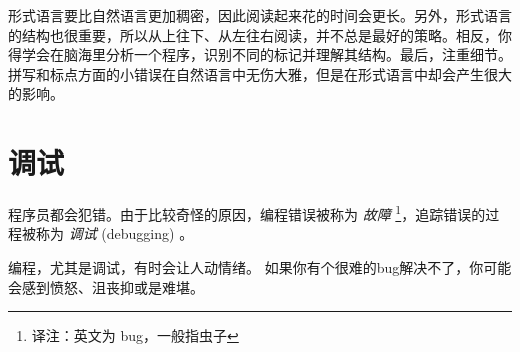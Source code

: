 
形式语言要比自然语言更加稠密，因此阅读起来花的时间会更长。另外，形式语言的结构也很重要，所以从上往下、从左往右阅读，并不总是最好的策略。相反，你得学会在脑海里分析一个程序，识别不同的标记并理解其结构。最后，注重细节。拼写和标点方面的小错误在自然语言中无伤大雅，但是在形式语言中却会产生很大的影响。

\section{调试}
  


程序员都会犯错。由于比较奇怪的原因，编程错误被称为 {\em 故障} \footnote{译注：英文为 bug，一般指虫子}，追踪错误的过程被称为 {\em 调试} (debugging) 。
  
  


编程，尤其是调试，有时会让人动情绪。 如果你有个很难的bug解决不了，你可能会感到愤怒、沮丧抑或是难堪。


